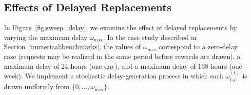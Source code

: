 \documentclass[opre,blindrev]{informs3}
\begin{document}
\vspace{-.1in}

\subsection{Effects of Delayed Replacements}\label{numerical:delayed}
In Figure~\ref{fig:sweep_delay}, we examine the effect of delayed replacements by varying the maximum delay \(\omega_{\max}\).
In the case study described in Section~\ref{numerical:benchmarks}, the values of \(\omega_{\max}\) correspond to a zero-delay case (requests may be realized in the same period before rewards are drawn), a maximum delay of 24 hours (one day), and a maximum delay of 168 hours (one week). We implement a stochastic delay-generation process in which each \(\omega^{(t)}_{i,j}\) is drawn uniformly from \(\{0,\dots,\omega_{\max}\}\).



\end{document}
